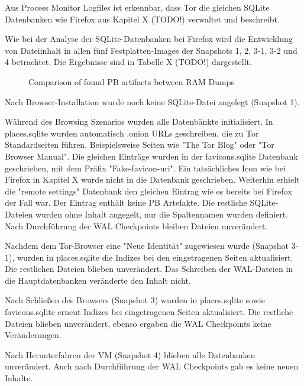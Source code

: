 Aus Process Monitor Logfiles ist erkennbar, dass Tor die gleichen SQLite Datenbanken wie Firefox aus Kapitel X (TODO!) verwaltet und beschreibt.
			
Wie bei der Analyse der SQLite-Datenbanken bei Firefox wird die Entwicklung von Dateiinhalt in allen fünf Festplatten-Images der Snapshots 1, 2, 3-1, 3-2 und 4 betrachtet. Die Ergebnisse sind in Tabelle X (TODO!) dargestellt.
\begin{figure}[h!]
	\centerline{}
	\label{chart:final-criteria}  
	\caption{Comparison of found PB artifacts between RAM Dumps}
\end{figure}
Nach Browser-Installation wurde noch keine SQLite-Datei angelegt (Snapshot 1).

Während des Browsing Szenarios wurden alle Datenbänkte initialisiert.
In places.sqlite wurden automatisch .onion URLs geschreiben, die zu Tor Standardseiten führen. Beispielsweise Seiten wie "The Tor Blog" oder "Tor Browser Manual".
Die gleichen Einträge wurden in der favicons.sqlite Datenbank geschrieben, mit dem Präfix "Fake-favicon-uri". Ein tatsächliches Icon wie bei Firefox in Kapitel X wurde nicht in die Datenbank geschrieben. 
Weiterhin erhielt die "remote settings" Datenbank den gleichen Eintrag wie es bereits bei Firefox der Fall war. Der Eintrag enthält keine PB Artefakte.
Die restliche SQLite-Dateien wurden ohne Inhalt angegelt, nur die Spaltennamen wurden definiert.
Nach Durchführung der WAL Checkpoints bleiben Dateien unverändert.

Nachdem dem Tor-Browser eine "Neue Identität" zugewiesen wurde (Snapshot 3-1), wurden in places.sqlite die Indizes bei den eingetragenen Seiten aktualisiert. Die restlichen Dateien blieben unverändert. Das Schreiben der WAL-Dateien in die Hauptdatenbanken veränderte den Inhalt nicht.

Nach Schließen des Browsers (Snapshot 3) wurden in places.sqlite sowie favicons.sqlite erneut Indizes bei eingetragenen Seiten aktualisiert. Die restliche Dateien blieben unverändert, ebenso ergaben die WAL Checkpoints keine Veränderungen.

Nach Herunterfahren der VM (Snapshot 4) blieben alle Datenbanken unverändert. Auch nach Durchführung der WAL Checkpoints gab es keine neuen Inhalte.

